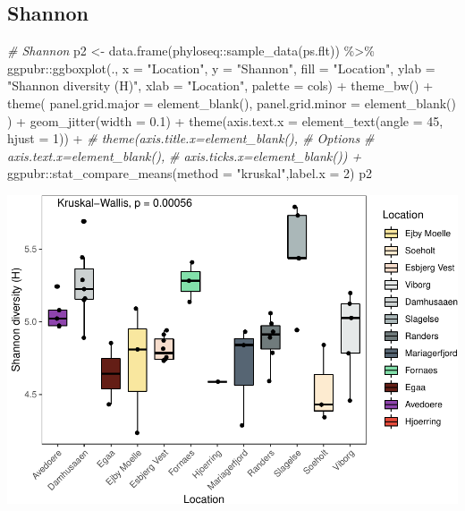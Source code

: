 \documentclass[
]{book}
\newenvironment{Shaded}{\begin{snugshade}}{\end{snugshade}}
\newcommand{\AttributeTok}[1]{\textcolor[rgb]{0.77,0.63,0.00}{#1}}
\newcommand{\CommentTok}[1]{\textcolor[rgb]{0.56,0.35,0.01}{\textit{#1}}}
\newcommand{\DecValTok}[1]{\textcolor[rgb]{0.00,0.00,0.81}{#1}}
\newcommand{\FloatTok}[1]{\textcolor[rgb]{0.00,0.00,0.81}{#1}}
\newcommand{\FunctionTok}[1]{\textcolor[rgb]{0.00,0.00,0.00}{#1}}
\newcommand{\NormalTok}[1]{#1}
\newcommand{\OtherTok}[1]{\textcolor[rgb]{0.56,0.35,0.01}{#1}}
\newcommand{\SpecialCharTok}[1]{\textcolor[rgb]{0.00,0.00,0.00}{#1}}
\newcommand{\StringTok}[1]{\textcolor[rgb]{0.31,0.60,0.02}{#1}}
\begin{document}
\hypertarget{shannon}{%
\subsection{Shannon}\label{shannon}}

\begin{Shaded}
\begin{Highlighting}[]
\CommentTok{\# Shannon}
\NormalTok{p2 }\OtherTok{\textless{}{-}} \FunctionTok{data.frame}\NormalTok{(phyloseq}\SpecialCharTok{::}\FunctionTok{sample\_data}\NormalTok{(ps.flt)) }\SpecialCharTok{\%\textgreater{}\%}
\NormalTok{  ggpubr}\SpecialCharTok{::}\FunctionTok{ggboxplot}\NormalTok{(., }\AttributeTok{x =} \StringTok{"Location"}\NormalTok{, }
                    \AttributeTok{y =} \StringTok{"Shannon"}\NormalTok{, }
                    \AttributeTok{fill =} \StringTok{"Location"}\NormalTok{, }
                    \AttributeTok{ylab =} \StringTok{"Shannon diversity (H)"}\NormalTok{, }
                    \AttributeTok{xlab =} \StringTok{"Location"}\NormalTok{, }
                    \AttributeTok{palette =}\NormalTok{ cols) }\SpecialCharTok{+}
    \FunctionTok{theme\_bw}\NormalTok{() }\SpecialCharTok{+}
    \FunctionTok{theme}\NormalTok{( }\AttributeTok{panel.grid.major =} \FunctionTok{element\_blank}\NormalTok{(), }\AttributeTok{panel.grid.minor =} \FunctionTok{element\_blank}\NormalTok{() ) }\SpecialCharTok{+}
    \FunctionTok{geom\_jitter}\NormalTok{(}\AttributeTok{width =} \FloatTok{0.1}\NormalTok{) }\SpecialCharTok{+}
   \FunctionTok{theme}\NormalTok{(}\AttributeTok{axis.text.x =} \FunctionTok{element\_text}\NormalTok{(}\AttributeTok{angle =} \DecValTok{45}\NormalTok{, }\AttributeTok{hjust =} \DecValTok{1}\NormalTok{)) }\SpecialCharTok{+} 
\CommentTok{\#    theme(axis.title.x=element\_blank(),  \# Options}
\CommentTok{\#        axis.text.x=element\_blank(),}
\CommentTok{\#        axis.ticks.x=element\_blank()) +}
\NormalTok{  ggpubr}\SpecialCharTok{::}\FunctionTok{stat\_compare\_means}\NormalTok{(}\AttributeTok{method =} \StringTok{"kruskal"}\NormalTok{,}\AttributeTok{label.x =} \DecValTok{2}\NormalTok{)}
\NormalTok{p2}
\end{Highlighting}
\end{Shaded}

\includegraphics{gitbook-demo_files/figure-latex/shannon-1.pdf}
\end{document}
